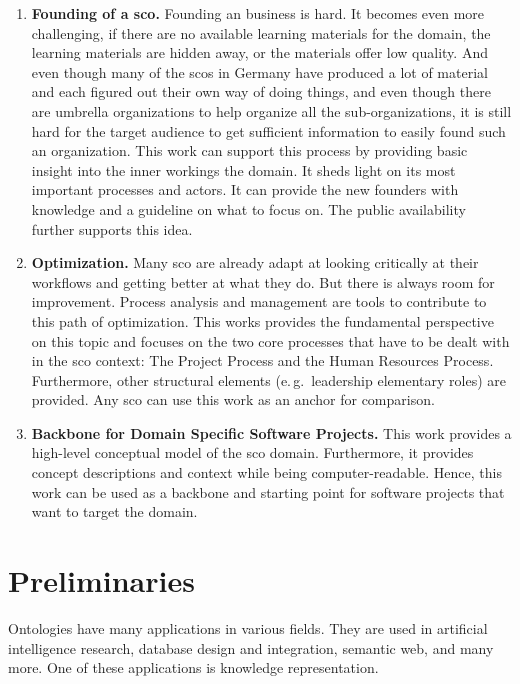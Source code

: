 \documentclass[a4paper, DIV=13, BCOR=0cm]{scrbook}
\newcommand{\eg}{e.\,g.\ }
\begin{document}
\begin{enumerate}
	\item \textbf{Founding of a \gls{sco}.} Founding an business is hard. It becomes even more challenging, if there are no available learning materials for the domain, the learning materials are hidden away, or the materials offer low quality. And even though many of the \glspl{sco} in Germany have produced a lot of material and each figured out their own way of doing things, and even though there are umbrella organizations to help organize all the sub-organizations, it is still hard for the target audience to get sufficient information to easily found such an organization. This work can support this process by providing basic insight into the inner workings the domain. It sheds light on its most important processes and actors. It can provide the new founders with knowledge and a guideline on what to focus on. The public availability further supports this idea.
	\item \textbf{Optimization.} Many \gls{sco} are already adapt at looking critically at their workflows and getting better at what they do. But there is always room for improvement. Process analysis and management are tools to contribute to this path of optimization. This works provides the fundamental perspective on this topic and focuses on the two core processes that have to be dealt with in the \gls{sco} context: The Project Process and the Human Resources Process. Furthermore, other structural elements (\eg leadership elementary roles) are provided. Any \gls{sco} can use this work as an anchor for comparison.
	\item \textbf{Backbone for Domain Specific Software Projects.} This work provides a high-level conceptual model of the \gls{sco} domain. Furthermore, it provides concept descriptions and context while being computer-readable. Hence, this work can be used as a backbone and starting point for software projects that want to target the domain.
\end{enumerate}

\chapter[Preliminaries \\\textcolor{gray}{
	{\footnotesize \textsl{Gives the background of this work and prepares for the subsequent elucidation.}}
}]{Preliminaries}
Ontologies have many applications in various fields. They are used in artificial intelligence research, database design and integration, semantic web, and many more. \cite[p.\,1]{Gomez-Perez:2004aa} One of these applications is knowledge representation.
\end{document}
